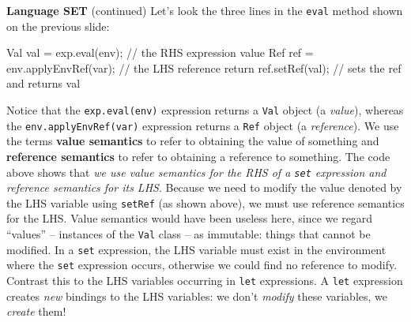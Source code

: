 \begin{minipage}[t]{\sw}
\slidenumber
\LARGE
{\bf Language SET} (continued)\exx
Let's look the three lines in the \verb'eval' method shown
on the previous slide:
{\Large
\begin{qv}
        Val val = exp.eval(env); // the RHS expression value
        Ref ref = env.applyEnvRef(var); // the LHS reference
        return ref.setRef(val);  // sets the ref and returns val
\end{qv}
}
Notice that the \verb'exp.eval(env)' expression
returns a \verb'Val' object (a {\em value}),
whereas the \verb'env.applyEnvRef(var)' expression
returns a \verb'Ref' object (a {\em reference}).
We use the terms {\bf value semantics} to refer
to obtaining the value of something
and {\bf reference semantics} to refer
to obtaining a reference to something.
The code above shows that {\em we use value semantics
for the RHS of a \verb'set' expression
and reference semantics for its LHS}.\exx
Because we need to modify the value denoted by
the LHS variable using \verb'setRef' (as shown above),
we must use reference semantics for the LHS.
Value semantics would have been useless here,
since we regard ``values'' -- instances of the \verb'Val' class --
as immutable: things that cannot be modified.\exx
In a \verb'set' expression, the LHS variable must exist
in the environment where the \verb'set' expression occurs,
otherwise we could find no reference to modify.
Contrast this to the LHS variables occurring in \verb'let' expressions.
A \verb'let' expression creates {\em new} bindings
to the LHS variables:
we don't {\em modify} these variables, we {\em create} them!
\end{minipage}
\clearpage

